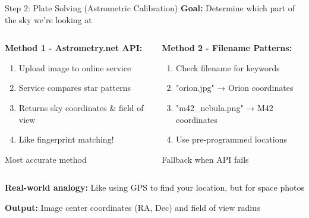 \documentclass[aspectratio=169]{beamer}
\begin{document}
\begin{frame}{Step 2: Plate Solving (Astrometric Calibration)}
\textbf{Goal:} Determine which part of the sky we're looking at

\begin{columns}
\begin{column}{0.5\textwidth}
\textbf{Method 1 - Astrometry.net API:}
\begin{enumerate}
\item Upload image to online service
\item Service compares star patterns
\item Returns sky coordinates \& field of view
\item Like fingerprint matching!
\end{enumerate}

\textcolor{stargreen}{Most accurate method}
\end{column}

\begin{column}{0.5\textwidth}
\textbf{Method 2 - Filename Patterns:}
\begin{enumerate}
\item Check filename for keywords
\item "orion.jpg" → Orion coordinates
\item "m42\_nebula.png" → M42 coordinates  
\item Use pre-programmed locations
\end{enumerate}

\textcolor{starred}{Fallback when API fails}
\end{column}
\end{columns}

\vspace{0.5cm}
\textbf{Real-world analogy:} \textcolor{starblue}{Like using GPS to find your location, but for space photos}

\vspace{0.3cm}
\textbf{Output:} Image center coordinates (RA, Dec) and field of view radius
\end{frame}
\end{document}
